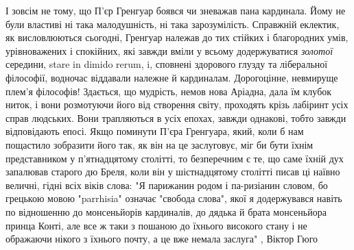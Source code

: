 І зовсім не тому, що П'єр Гренгуар боявся чи зневажав пана кардинала. Йому не
були властиві ні така малодушність, ні така зарозумілість. Справжній еклектик,
як висловлюються сьогодні, Гренгуар належав до тих стійких і благородних умів,
урівноважених і спокійних, які завжди вміли у всьому додержуватися \emph{золотої}
середини, stare in dimido rerum, i, сповнені здорового глузду та ліберальної
філософії, водночас віддавали належне й кардиналам. Дорогоцінне, невмируще
плем'я філософів! Здається, що мудрість, немов нова Аріадна, дала їм клубок
ниток, і вони розмотуючи його від створення світу, проходять крізь лабіринт
усіх справ людських. Вони трапляються в усіх епохах, завжди однакові, тобто
завжди відповідають епосі. Якщо поминути П'єра Гренгуара, який, коли б нам
пощастило зобразити його так, як він на це заслуговує, міг би бути їхнім
представником у п'ятнадцятому столітті, то безперечним є те, що саме їхній дух
запалював старого дю Бреля, коли він у шістнадцятому столітті писав ці наївно
величні, гідні всіх віків слова: "Я парижанин родом і па-ризіанин словом, бо
грецькою мовою "parrhisia" означає "свобода слова", якої я додержувався навіть
по відношенню до монсеньйорів кардиналів, до дядька й брата монсеньйора принца
Конті, але все ж таки з пошаною до їхнього високого стану і не ображаючи нікого
з їхнього почту, а це вже немала заслуга"
, Віктор Гюго
